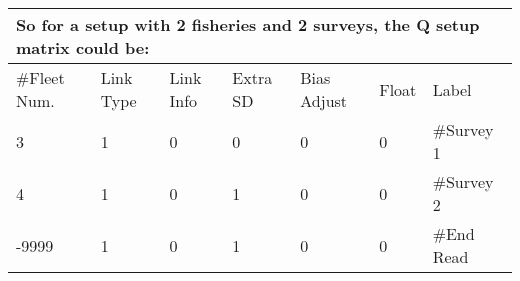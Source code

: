 \begin{center}
	\begin{longtable}{p{2cm} p{2cm} p{2cm} p{2cm} p{2cm} p{1.5cm} p{2.5cm}}
		\multicolumn{7}{l}{So for a setup with 2 fisheries and 2 surveys, the Q setup matrix could be:}\\
		\hline
	    \#Fleet Num. & Link Type & Link Info & Extra SD & Bias Adjust & Float  & Label \\
	    \hline
	    3 & 1 & 0 & 0 & 0 & 0 & \#Survey 1 \\
	    4 & 1 & 0 & 1 & 0 & 0 & \#Survey 2 \\
	    -9999 & 1 & 0 & 1 & 0 & 0 & \#End Read \\
	    \hline
	\end{longtable}
\end{center}






